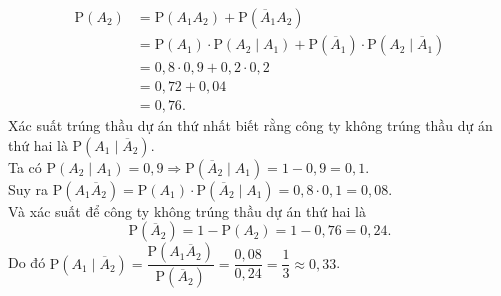 \begin{ex}
{\begin{itemchoice}
			\begin{align*}
				\mathrm{P}( A_2) &= \mathrm{P}(A_1A_2) + \mathrm{P}\left(\overline{A}_1A_2\right)\\
				&= \mathrm{P}(A_1) \cdot \mathrm{P}(A_2 \mid A_1) + \mathrm{P}\left(\overline{A}_1\right) \cdot \mathrm{P}( A_2 \mid \overline{A}_1)\\
				&= 0{,}8 \cdot 0{,}9 + 0{,}2 \cdot 0{,}2\\
				&= 0{,}72 + 0{,}04\\
				&= 0{,}76.
			\end{align*}
			\itemch Xác suất trúng thầu dự án thứ nhất biết rằng công ty không trúng thầu dự án thứ hai là $\mathrm{P}( A_1 \mid \overline{A}_2)$.\\
			Ta có $\mathrm{P}(A_2 \mid A_1)= 0{,}9 \Rightarrow \mathrm{P}\left(\overline{A}_2 \mid A_1\right)=1-0{,}9=0{,}1$.\\
			Suy ra $\mathrm{P}\left(A_1\overline{A}_2\right) = \mathrm{P}(A_1) \cdot \mathrm{P}\left(\overline{A}_2 \mid A_1\right)= 0{,}8 \cdot 0{,}1 = 0{,}08$.\\
			Và xác suất để công ty không trúng thầu dự án thứ hai là \[\mathrm{P}\left(\overline{A}_2\right)= 1 - \mathrm{P}(A_2) = 1 - 0{,}76 = 0{,}24.\]
			Do đó $\mathrm{P}\left(A_1 \mid \overline{A}_2\right) = \dfrac{\mathrm{P}\left(A_1\overline{A}_2\right) }{\mathrm{P}\left(\overline{A}_2\right)} = \dfrac{0{,}08}{0{,}24} = \dfrac{1}{3} \approx 0{,}33$.
		\end{itemchoice}
	}
\end{ex}

